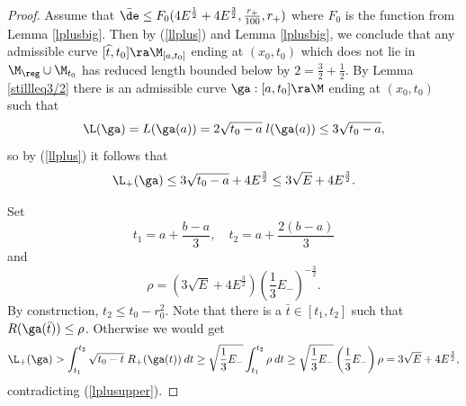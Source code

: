 \begin{proof}
Assume that $\bar\de\leq F_0(4E^{\frac12}+4E^{\frac32},\frac{r_+}{100},r_+)$
where $F_0$ is the function from Lemma \ref{lplusbig}.
Then by (\ref{llplus}) and Lemma \ref{lplusbig},
we conclude that any admissible
curve
$[\widehat{t},t_0]\ra \M_{[a,t_0]}$
ending at $(x_0,t_0)$
which does not lie in $\M_{\reg}\cup \M_{t_0}$
has reduced length bounded below by $2=\frac32+\frac12$.  By Lemma
\ref{stillleq3/2} there is an admissible curve $\ga:[a,t_0]\ra\M$
ending at $(x_0,t_0)$ such that
\begin{equation}
\L(\ga)=L(\ga(a))=2\sqrt{t_0-a}\;l(\ga(a))\leq 3\sqrt{t_0-a},
\end{equation}
so by (\ref{llplus}) it follows that
\begin{equation}
\label{lplusupper}
\L_+(\ga)\leq 3\sqrt{t_0-a}+4E^{\frac32}\leq 3\sqrt{E}+4E^{\frac32}.
\end{equation}


Set
\begin{equation}
t_1= a+\frac{b-a}{3},\quad t_2= a+\frac{2(b-a)}{3}
\end{equation}
and
\begin{equation}
\rho= \left(3\sqrt{E}+4E^{\frac32}\right)
\left(\frac13 E_-\right)^{-\frac32}.
\end{equation}
By construction, $t_2 \le t_0 - r_0^2$.
Note that there is a $\bar t\in [t_1,t_2]$ such that
$R(\ga(\bar t))\leq \rho$.
Otherwise we would get
\begin{equation}
\L_+(\ga) > \int_{t_1}^{t_2}\sqrt{t_0-t}\;R_+(\ga(t)) \: dt
\geq \sqrt{\frac13 E_-}\int_{t_1}^{t_2}\rho \: dt
\geq \sqrt{\frac13 E_-}\left(\frac13 E_-\right)\rho=3\sqrt{E}+4E^{\frac32},
\end{equation}
contradicting (\ref{lplusupper}).


\end{proof}
